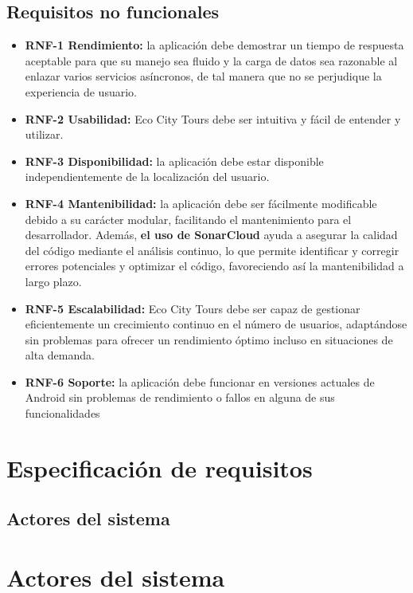 \subsection{Requisitos no funcionales}
\begin{itemize}
	\item \textbf{RNF-1 Rendimiento:} la aplicación debe demostrar un tiempo de respuesta aceptable para que su manejo sea fluido y la carga de datos sea razonable al enlazar varios servicios asíncronos, de tal manera que no se perjudique la experiencia de usuario. 
	\item \textbf{RNF-2 Usabilidad:} Eco City Tours debe ser intuitiva y fácil de entender y utilizar.
	\item \textbf{RNF-3 Disponibilidad:} la aplicación debe estar disponible independientemente de la localización del usuario.
	\item \textbf{RNF-4 Mantenibilidad:} la aplicación debe ser fácilmente modificable debido a su carácter modular, facilitando el mantenimiento para el desarrollador. Además, \textbf{el uso de SonarCloud} ayuda a asegurar la calidad del código mediante el análisis continuo, lo que permite identificar y corregir errores potenciales y optimizar el código, favoreciendo así la mantenibilidad a largo plazo.
	
	\item \textbf{RNF-5 Escalabilidad:} Eco City Tours debe ser capaz de gestionar eficientemente un crecimiento continuo en el número de usuarios, adaptándose sin problemas para ofrecer un rendimiento óptimo incluso en situaciones de alta demanda.
	\item \textbf{RNF-6 Soporte:} la aplicación debe funcionar en versiones actuales de Android sin problemas de rendimiento o fallos en alguna de sus funcionalidades
\end{itemize}
\clearpage

\section{Especificación de requisitos}

\subsection{Actores del sistema}

\section{Actores del sistema}

